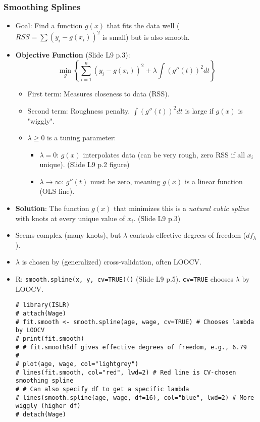\documentclass[12pt,a4paper]{article}
\newcommand{\Rfunction}[1]{\texttt{#1()}} %
\newcommand{\Rcode}[1]{\texttt{#1}} %
\begin{document}
\begin{itemize}
    \subsubsection{Smoothing Splines }
        \begin{itemize}
            \item Goal: Find a function $g(x)$ that fits the data well ($RSS = \sum (y_i - g(x_i))^2$ is small) but is also smooth.
            \item \textbf{Objective Function} (Slide L9 p.3):
                $$ \min_{g} \left\{ \sum_{i=1}^{n} (y_i - g(x_i))^2 + \lambda \int (g''(t))^2 dt \right\} $$
                \begin{itemize}
                    \item First term: Measures closeness to data (RSS).
                    \item Second term: Roughness penalty. $\int (g''(t))^2 dt$ is large if $g(x)$ is "wiggly".
                    \item $\lambda \ge 0$ is a tuning parameter:
                        \begin{itemize}
                            \item $\lambda = 0$: $g(x)$ interpolates data (can be very rough, zero RSS if all $x_i$ unique). (Slide L9 p.2 figure)
                            \item $\lambda \to \infty$: $g''(t)$ must be zero, meaning $g(x)$ is a linear function (OLS line).
                        \end{itemize}
                \end{itemize}
            \item \textbf{Solution}: The function $g(x)$ that minimizes this is a \textit{natural cubic spline} with knots at every unique value of $x_i$. (Slide L9 p.3)
            \item Seems complex (many knots), but $\lambda$ controls effective degrees of freedom ($df_{\lambda}$).
            \item $\lambda$ is chosen by (generalized) cross-validation, often LOOCV.
            \item R: \Rfunction{smooth.spline(x, y, cv=TRUE)} (Slide L9 p.5). \Rcode{cv=TRUE} chooses $\lambda$ by LOOCV.
\begin{lstlisting}[caption={Smoothing Spline with Wage Data (Slide L9 p.5)}]
# library(ISLR)
# attach(Wage)
# fit.smooth <- smooth.spline(age, wage, cv=TRUE) # Chooses lambda by LOOCV
# print(fit.smooth)
# # fit.smooth$df gives effective degrees of freedom, e.g., 6.79
# 
# plot(age, wage, col="lightgrey")
# lines(fit.smooth, col="red", lwd=2) # Red line is CV-chosen smoothing spline
# # Can also specify df to get a specific lambda
# lines(smooth.spline(age, wage, df=16), col="blue", lwd=2) # More wiggly (higher df)
# detach(Wage)
\end{lstlisting}
        \end{itemize}


\end{itemize}
\end{document}
